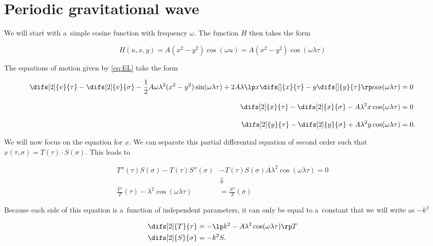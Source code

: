 \section{Periodic gravitational wave}

We will start with a~simple cosine function with frequency $\omega$. The function $H$ then takes the form

\begin{equation}
    H(u, x, y) = A ( x^2 - y^2 ) \cos (\omega u) = A ( x^2 - y^2 ) \cos (\omega \lambda \tau)
\end{equation}

\noindent
The equations of motion given by \cref{eq:EL} take the form

\begin{equation}
    \begin{aligned}
        \difs[2]{v}{\tau} - \difs[2]{v}{\sigma}
         - \frac{1}{2} A \omega \lambda^2 (x^2-y^2) \sin(\omega \lambda \tau)
         + 2 A \lambda \lp x \difs[]{x}{\tau} - y \difs[]{y}{\tau} \rp cos(\omega \lambda \tau) & = 0\\[3mm]
        \difs[2]{x}{\tau} - \difs[2]{x}{\sigma} - A \lambda^2 x \cos(\omega \lambda \tau) & = 0 \\[3mm]
        \difs[2]{y}{\tau} - \difs[2]{y}{\sigma} + A \lambda^2 y \cos(\omega \lambda \tau) & = 0.
    \end{aligned}
\end{equation}

\noindent
We will now focus on the equation for $x$. We can separate this partial differential equation of second order such that $x(\tau, \sigma) = T(\tau) \cdot S(\sigma)$. This leads to


\begin{align}
    T''(\tau) S(\sigma) - T(\tau) S''(\sigma) & - T(\tau) S(\sigma) A \lambda^2 \cos(\omega \lambda \tau) = 0 \\[8pt]
    & \Downarrow \nonumber \\[8pt]
    \frac{T''}{T}(\tau) - \lambda^2 \cos(\omega \lambda \tau) & = \frac{S''}{S} (\sigma)
\end{align}

\noindent
Because each side of this equation is a~function of independent parameters, it can only be equal to a~constant that we will write as $-k^2$

\begin{align}
    \label{eq:grav_T_k}     \difs[2]{T}{\tau} & = - \lp k^2 - A \lambda^2 \cos(\omega \lambda \tau) \rp T \\
    \label{eq:grav_S_k}     \difs[2]{S}{\sigma} & = - k^2 S. 
\end{align}

